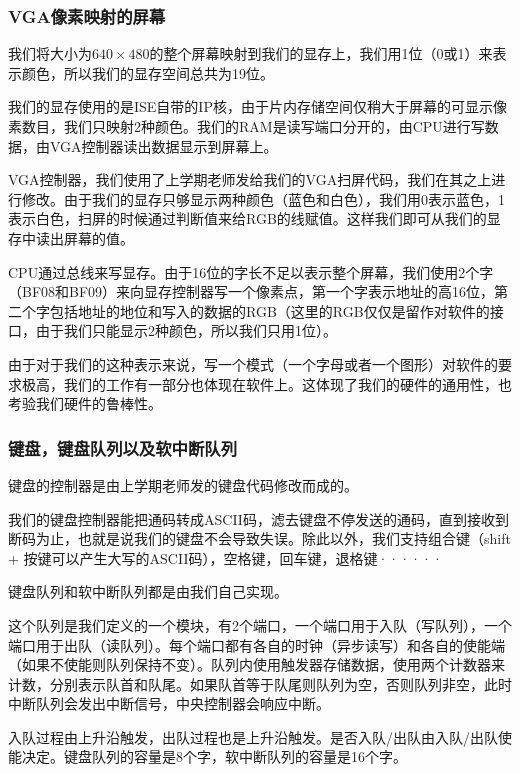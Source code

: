 \subsubsection{VGA像素映射的屏幕}

我们将大小为$640 \times 480$的整个屏幕映射到我们的显存上，我们用1位（0或1）来表示颜色，所以我们的显存空间总共为19位。 

我们的显存使用的是ISE自带的IP核，由于片内存储空间仅稍大于屏幕的可显示像素数目，我们只映射2种颜色。我们的RAM是读写端口分开的，由CPU进行写数据，由VGA控制器读出数据显示到屏幕上。

VGA控制器，我们使用了上学期老师发给我们的VGA扫屏代码，我们在其之上进行修改。由于我们的显存只够显示两种颜色（蓝色和白色），我们用0表示蓝色，1表示白色，扫屏的时候通过判断值来给RGB的线赋值。这样我们即可从我们的显存中读出屏幕的值。

CPU通过总线来写显存。由于16位的字长不足以表示整个屏幕，我们使用2个字（BF08和BF09）来向显存控制器写一个像素点，第一个字表示地址的高16位，第二个字包括地址的地位和写入的数据的RGB（这里的RGB仅仅是留作对软件的接口，由于我们只能显示2种颜色，所以我们只用1位）。

由于对于我们的这种表示来说，写一个模式（一个字母或者一个图形）对软件的要求极高，我们的工作有一部分也体现在软件上。这体现了我们的硬件的通用性，也考验我们硬件的鲁棒性。


\subsubsection{键盘，键盘队列以及软中断队列}

键盘的控制器是由上学期老师发的键盘代码修改而成的。

我们的键盘控制器能把通码转成ASCII码，滤去键盘不停发送的通码，直到接收到断码为止，也就是说我们的键盘不会导致失误。除此以外，我们支持组合键（shift + 按键可以产生大写的ASCII码），空格键，回车键，退格键······

键盘队列和软中断队列都是由我们自己实现。

这个队列是我们定义的一个模块，有2个端口，一个端口用于入队（写队列），一个端口用于出队（读队列）。每个端口都有各自的时钟（异步读写）和各自的使能端（如果不使能则队列保持不变）。队列内使用触发器存储数据，使用两个计数器来计数，分别表示队首和队尾。如果队首等于队尾则队列为空，否则队列非空，此时中断队列会发出中断信号，中央控制器会响应中断。

入队过程由上升沿触发，出队过程也是上升沿触发。是否入队/出队由入队/出队使能决定。键盘队列的容量是8个字，软中断队列的容量是16个字。

